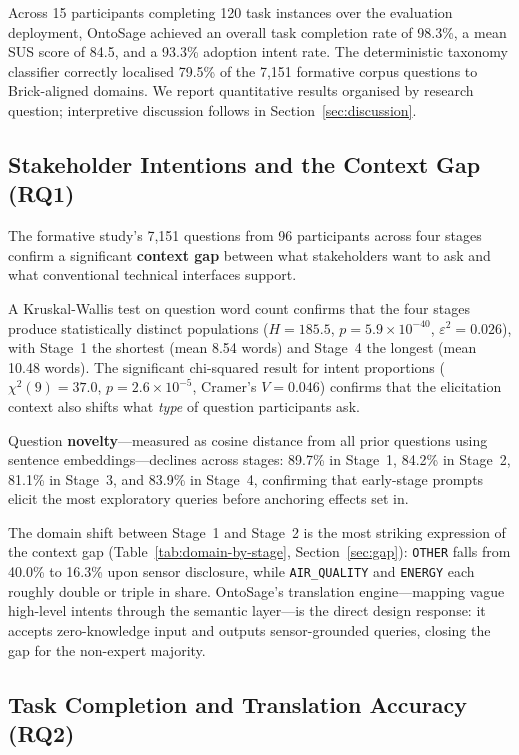 \documentclass[acmsmall]{acmart}
\begin{document}
Across 15 participants completing 120 task instances over the evaluation deployment, OntoSage achieved an overall task completion rate of 98.3\%, a mean SUS score of 84.5, and a 93.3\% adoption intent rate. The deterministic taxonomy classifier correctly localised 79.5\% of the 7{,}151 formative corpus questions to Brick-aligned domains. We report quantitative results organised by research question; interpretive discussion follows in Section~\ref{sec:discussion}.


\subsection{Stakeholder Intentions and the Context Gap (RQ1)}
\label{sec:rq1}

The formative study's 7{,}151 questions from 96 participants across four stages confirm a significant \textbf{context gap} between what stakeholders want to ask and what conventional technical interfaces support.

A Kruskal-Wallis test on question word count confirms that the four stages produce statistically distinct populations ($H=185.5$, $p=5.9 \times 10^{-40}$, $\varepsilon^2=0.026$), with Stage~1 the shortest (mean 8.54 words) and Stage~4 the longest (mean 10.48 words). The significant chi-squared result for intent proportions ($\chi^2(9)=37.0$, $p=2.6 \times 10^{-5}$, Cramer's $V=0.046$) confirms that the elicitation context also shifts what \emph{type} of question participants ask.

Question \textbf{novelty}---measured as cosine distance from all prior questions using sentence embeddings---declines across stages: 89.7\% in Stage~1, 84.2\% in Stage~2, 81.1\% in Stage~3, and 83.9\% in Stage~4, confirming that early-stage prompts elicit the most exploratory queries before anchoring effects set in.

The domain shift between Stage~1 and Stage~2 is the most striking expression of the context gap (Table~\ref{tab:domain-by-stage}, Section~\ref{sec:gap}): \texttt{OTHER} falls from 40.0\% to 16.3\% upon sensor disclosure, while \texttt{AIR\_QUALITY} and \texttt{ENERGY} each roughly double or triple in share. OntoSage's translation engine---mapping vague high-level intents through the semantic layer---is the direct design response: it accepts zero-knowledge input and outputs sensor-grounded queries, closing the gap for the non-expert majority.

\subsection{Task Completion and Translation Accuracy (RQ2)}
\label{sec:rq2}
\end{document}
